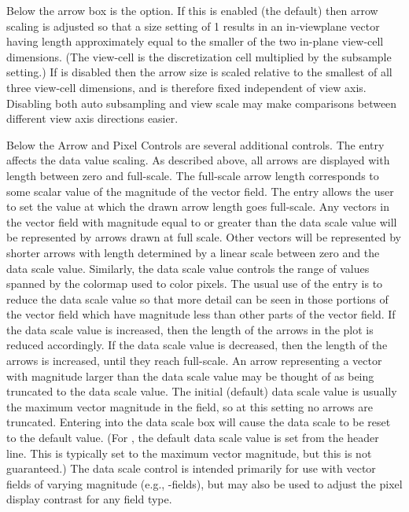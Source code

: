 Below the arrow  box is the  option. If this
is enabled (the default) then arrow scaling is adjusted so that a size
setting of 1 results in an in-viewplane vector having length
approximately equal to the smaller of the two in-plane view-cell
dimensions. (The view-cell is the discretization cell multiplied by the
subsample setting.) If  is disabled then the arrow size
is scaled relative to the smallest of all three view-cell dimensions,
and is therefore fixed independent of view axis. Disabling both auto
subsampling and view scale may make comparisons between different view
axis directions easier.

Below the Arrow and Pixel Controls are several additional controls.  The
\label{html:mmdispdatascale} entry
affects the data value scaling.  As described above, all arrows are
displayed with length between zero and full-scale.  The full-scale arrow
length corresponds to some scalar value of the magnitude of the vector
field.  The  entry allows the user to
set the value at which the drawn arrow length goes full-scale.  Any
vectors in the vector field with magnitude equal to or greater than the
data scale value will be represented by arrows drawn at full scale.
Other vectors will be represented by shorter arrows with length
determined by a linear scale between zero and the data scale value.
Similarly, the data scale value controls the range of values spanned by
the colormap used to color pixels.  The usual use of the
 entry is to reduce the data
scale value so that more detail can be seen in those portions of
the vector field which have magnitude less than other parts of the
vector field.
If the data scale value is increased, then the length of the
arrows in the plot is reduced accordingly.  If the data scale value is
decreased, then the length of the arrows is increased, until they
reach full-scale.
An arrow representing a vector with magnitude larger than the
data scale value may be thought of as being truncated to the data scale
value.  The initial (default) data scale value is usually the maximum
vector magnitude in the field, so at this setting no arrows are
truncated.  Entering  into the data scale box will cause the data
scale to be reset to the default value.  (For ,
the default data scale value is set from the \cd{ValueRangeMaxMag}
header line.  This is typically set to the maximum vector magnitude, but
this is not guaranteed.)  The data scale control is intended primarily
for use with vector fields of varying magnitude (e.g., \vH -fields), but
may also be used to adjust the pixel display contrast for any field
type.

